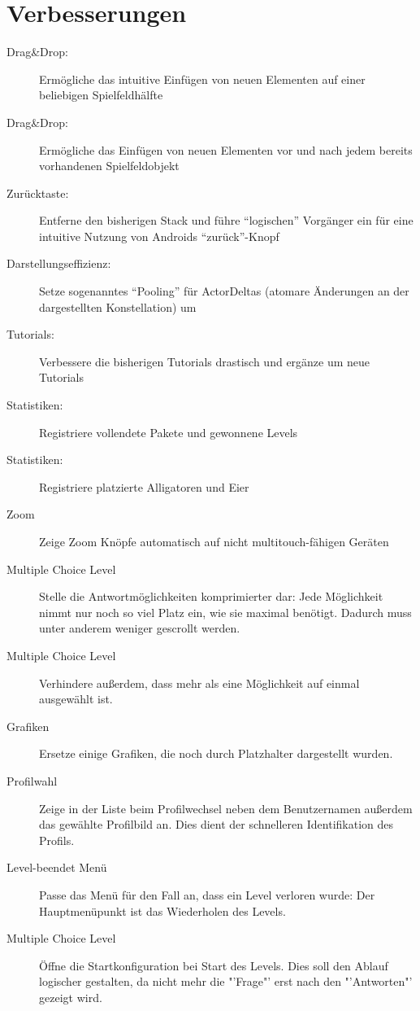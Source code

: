 \chapter{Verbesserungen}
\begin{description}
	\item[Drag\&Drop:] Ermögliche das intuitive Einfügen von neuen Elementen auf einer beliebigen Spielfeldhälfte
	\item[Drag\&Drop:] Ermögliche das Einfügen von neuen Elementen vor und nach jedem bereits vorhandenen Spielfeldobjekt
	\item[Zurücktaste:] Entferne den bisherigen Stack und führe "`logischen"' Vorgänger ein für eine intuitive Nutzung von Androids "`zurück"'-Knopf
	\item[Darstellungseffizienz:] Setze sogenanntes "`Pooling"' für ActorDeltas (atomare Änderungen an der dargestellten Konstellation) um
	\item[Tutorials:] Verbessere die bisherigen Tutorials drastisch und ergänze um neue Tutorials
	\item[Statistiken:] Registriere vollendete Pakete und gewonnene Levels
	\item[Statistiken:] Registriere platzierte Alligatoren und Eier
	\item[Zoom] Zeige Zoom Knöpfe automatisch auf nicht multitouch-fähigen Geräten
	\item[Multiple Choice Level] Stelle die Antwortmöglichkeiten komprimierter dar: Jede Möglichkeit nimmt nur noch so viel Platz ein, wie sie maximal benötigt. Dadurch muss unter anderem weniger gescrollt werden.
	\item[Multiple Choice Level] Verhindere außerdem, dass mehr als eine Möglichkeit auf einmal ausgewählt ist.
	\item[Grafiken] Ersetze einige Grafiken, die noch durch Platzhalter dargestellt wurden.
	\item[Profilwahl] Zeige in der Liste beim Profilwechsel neben dem Benutzernamen außerdem das gewählte Profilbild an. Dies dient der schnelleren Identifikation des Profils.
	\item[Level-beendet Menü] Passe das Menü für den Fall an, dass ein Level verloren wurde: Der Hauptmenüpunkt ist das Wiederholen des Levels.
	\item[Multiple Choice Level] Öffne die Startkonfiguration bei Start des Levels. Dies soll den Ablauf logischer gestalten, da nicht mehr die "'Frage"' erst nach den "'Antworten"' gezeigt wird.
\end{description}
